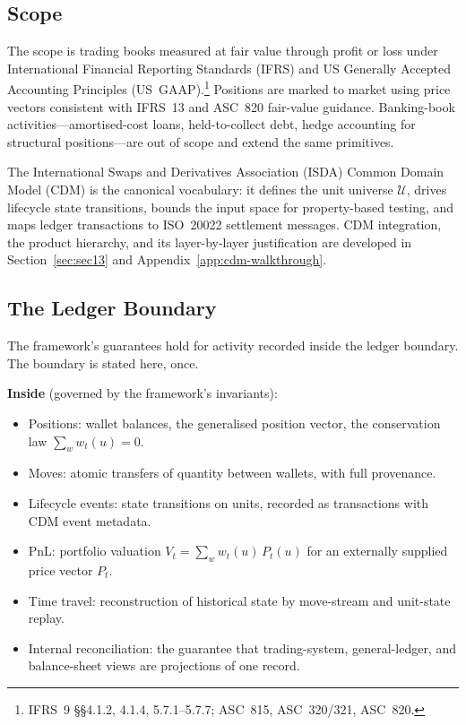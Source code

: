 

\subsection{Scope}

The scope is trading books measured at fair value through profit or loss under International Financial Reporting Standards (IFRS) and US Generally Accepted Accounting Principles (US~GAAP).\footnote{IFRS~9 \S\S4.1.2, 4.1.4, 5.7.1--5.7.7; ASC~815, ASC~320/321, ASC~820.} Positions are marked to market using price vectors consistent with IFRS~13 and ASC~820 fair-value guidance. Banking-book activities---amortised-cost loans, held-to-collect debt, hedge accounting for structural positions---are out of scope and extend the same primitives.

The International Swaps and Derivatives Association (ISDA) Common Domain Model (CDM) is the canonical vocabulary: it defines the unit universe $\mathcal{U}$, drives lifecycle state transitions, bounds the input space for property-based testing, and maps ledger transactions to ISO~20022 settlement messages. CDM integration, the product hierarchy, and its layer-by-layer justification are developed in Section~\ref{sec:sec13} and Appendix~\ref{app:cdm-walkthrough}.

\subsection{The Ledger Boundary}
\label{sec:scope-overview}

The framework's guarantees hold for activity recorded inside the ledger boundary. The boundary is stated here, once.

\medskip
\noindent\textbf{Inside} (governed by the framework's invariants):
\begin{itemize}[nosep]
\item Positions: wallet balances, the generalised position vector, the conservation law $\sum_w w_t(u) = 0$.
\item Moves: atomic transfers of quantity between wallets, with full provenance.
\item Lifecycle events: state transitions on units, recorded as transactions with CDM event metadata.
\item PnL: portfolio valuation $V_t = \sum_w w_t(u)\,P_t(u)$ for an externally supplied price vector $P_t$.
\item Time travel: reconstruction of historical state by move-stream and unit-state replay.
\item Internal reconciliation: the guarantee that trading-system, general-ledger, and balance-sheet views are projections of one record.
\end{itemize}

